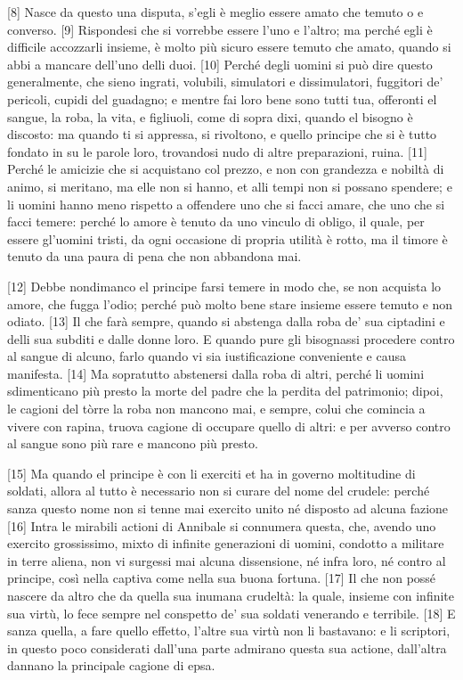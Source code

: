 {[}8{]} Nasce da questo una disputa, s'egli è meglio essere amato che
temuto o e converso. {[}9{]} Rispondesi che si vorrebbe essere l'uno e
l'altro; ma perché egli è difficile accozzarli insieme, è molto più
sicuro essere temuto che amato, quando si abbi a mancare dell'uno delli
duoi. {[}10{]} Perché degli uomini si può dire questo generalmente, che
sieno ingrati, volubili, simulatori e dissimulatori, fuggitori de'
pericoli, cupidi del guadagno; e mentre fai loro bene sono tutti tua,
offeronti el sangue, la roba, la vita, e figliuoli, come di sopra dixi,
quando el bisogno è discosto: ma quando ti si appressa, si rivoltono, e
quello principe che si è tutto fondato in su le parole loro, trovandosi
nudo di altre preparazioni, ruina. {[}11{]} Perché le amicizie che si
acquistano col prezzo, e non con grandezza e nobiltà di animo, si
meritano, ma elle non si hanno, et alli tempi non si possano spendere; e
li uomini hanno meno rispetto a offendere uno che si facci amare, che
uno che si facci temere: perché lo amore è tenuto da uno vinculo di
obligo, il quale, per essere gl'uomini tristi, da ogni occasione di
propria utilità è rotto, ma il timore è tenuto da una paura di pena che
non abbandona mai.

{[}12{]} Debbe nondimanco el principe farsi temere in modo che, se non
acquista lo amore, che fugga l'odio; perché può molto bene stare insieme
essere temuto e non odiato. {[}13{]} Il che farà sempre, quando si
abstenga dalla roba de' sua ciptadini e delli sua subditi e dalle donne
loro. E quando pure gli bisognassi procedere contro al sangue di alcuno,
farlo quando vi sia iustificazione conveniente e causa manifesta.
{[}14{]} Ma sopratutto abstenersi dalla roba di altri, perché li uomini
sdimenticano più presto la morte del padre che la perdita del
patrimonio; dipoi, le cagioni del tòrre la roba non mancono mai, e
sempre, colui che comincia a vivere con rapina, truova cagione di
occupare quello di altri: e per avverso contro al sangue sono più rare e
mancono più presto.

{[}15{]} Ma quando el principe è con li exerciti et ha in governo
moltitudine di soldati, allora al tutto è necessario non si curare del
nome del crudele: perché sanza questo nome non si tenne mai exercito
unito né disposto ad alcuna fazione {[}16{]} Intra le mirabili actioni
di Annibale si connumera questa, che, avendo uno exercito grossissimo,
mixto di infinite generazioni di uomini, condotto a militare in terre
aliena, non vi surgessi mai alcuna dissensione, né infra loro, né contro
al principe, così nella captiva come nella sua buona fortuna. {[}17{]}
Il che non possé nascere da altro che da quella sua inumana crudeltà: la
quale, insieme con infinite sua virtù, lo fece sempre nel conspetto de'
sua soldati venerando e terribile. {[}18{]} E sanza quella, a fare
quello effetto, l'altre sua virtù non li bastavano: e li scriptori, in
questo poco considerati dall'una parte admirano questa sua actione,
dall'altra dannano la principale cagione di epsa.

